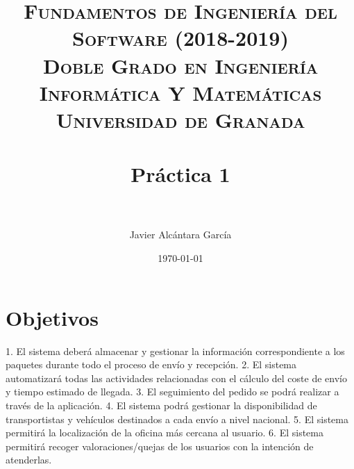 



\title{	
\normalfont \normalsize 
\textsc{\textbf{Fundamentos de Ingeniería del Software (2018-2019)} \\ Doble Grado en Ingeniería Informática Y Matemáticas \\ Universidad de Granada} \\ [25pt] %
\horrule{0.5pt} \\[0.4cm] %
\huge Práctica 1 \\ %
\horrule{2pt} \\[0.5cm] %
}

\author{Javier Alcántara García}%

\date{\normalsize\today} %





\maketitle %

\newpage %

\tableofcontents %

\listoffigures

\listoftables

\newpage


\section{Objetivos}
1. El sistema deberá almacenar y gestionar la información correspondiente a los paquetes durante todo el proceso de envío y recepción.
2. El sistema automatizará todas las actividades relacionadas con el cálculo del coste de envío y tiempo estimado de llegada.
3. El seguimiento del pedido se podrá realizar a través de la aplicación.
4. El sistema podrá gestionar la disponibilidad de transportistas y vehículos destinados a cada envío a nivel nacional.
5. El sistema permitirá la localización de la oficina más cercana al usuario.
6. El sistema permitirá recoger valoraciones/quejas de los usuarios con la intención de atenderlas.
 

